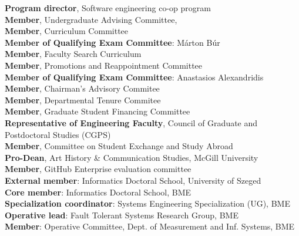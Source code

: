 \documentclass{xetexCV}
\begin{document}


\newpage


\textbf{Program director}, Software engineering co-op program \\
\textbf{Member}, Undergraduate Advising Committee,  \\
\textbf{Member}, Curriculum Committee \\
\textbf{Member of Qualifying Exam Committee}:  M\'arton B\'ur\\
\textbf{Member}, Faculty Search Curriculum \\
\textbf{Member}, Promotions and Reappointment Committee \\
\textbf{Member of Qualifying Exam Committee}:  Anastasios Alexandridis \\
\textbf{Member}, Chairman's Advisory Commitee \\
\textbf{Member}, Departmental Tenure Commitee \\
\textbf{Member}, Graduate Student Financing Committee \\

\textbf{Representative of Engineering Faculty},  Council of Graduate and Postdoctoral Studies (CGPS) \\
\textbf{Member}, Committee on Student Exchange and Study Abroad  \\
\textbf{Pro-Dean},  Art History \& Communication Studies, McGill University \\
\textbf{Member}, GitHub Enterprise evaluation committee \\

\textbf{External member}:  Informatics Doctoral School, University of Szeged  \\
\textbf{Core member}:  Informatics Doctoral School, BME   \\
\textbf{Specialization coordinator}:  Systems Engineering Specialization (UG), BME   \\
\textbf{Operative lead}:  Fault Tolerant Systems Research Group, BME   \\
\textbf{Member}:  Operative Committee, Dept. of Measurement and Inf. Systems, BME   \\
\end{document}
